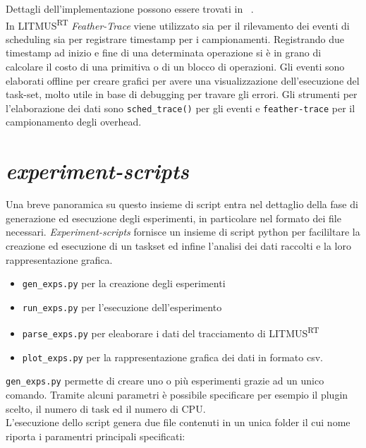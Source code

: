 \begin{appendices}
\noindent Dettagli dell'implementazione possono essere trovati in ~\cite{Brandenburg07feather-trace:a}.\\

\noindent In LITMUS\textsuperscript{RT} \textit{Feather-Trace} viene utilizzato sia per il rilevamento dei eventi di scheduling sia per registrare timestamp per i campionamenti. Registrando due timestamp ad inizio e fine di una determinata operazione si è in grano di calcolare il costo di una primitiva o di un blocco di operazioni. Gli eventi sono elaborati offline per creare grafici per avere una visualizzazione dell'esecuzione del task-set, molto utile in base di debugging per travare gli errori. Gli strumenti per l'elaborazione dei dati sono \texttt{sched\_trace()} per gli eventi e \texttt{feather-trace} per il campionamento degli overhead.\\

\section{\textit{experiment-scripts}}
\label{sec:exp-script}

\noindent Una breve panoramica su questo insieme di script entra nel dettaglio della fase di generazione ed esecuzione degli esperimenti, in particolare nel formato dei file necessari. \textit{Experiment-scripts} fornisce un insieme di script python per facililtare la creazione ed esecuzione di un taskset ed infine l'analisi dei dati raccolti e la loro rappresentazione grafica.\\

\begin{itemize}
	\item \texttt{gen\_exps.py} per la creazione degli esperimenti
	\item \texttt{run\_exps.py} per l'esecuzione dell'esperimento
	\item \texttt{parse\_exps.py} per eleaborare i dati del tracciamento di LITMUS\textsuperscript{RT}
	\item \texttt{plot\_exps.py} per la rappresentazione grafica dei dati in formato csv.
\end{itemize}

\noindent \texttt{gen\_exps.py} permette di creare uno o più esperimenti grazie ad un unico comando. Tramite alcuni parametri è possibile specificare per esempio il plugin scelto, il numero di task ed il numero di CPU.\\

\noindent L'esecuzione dello script genera due file contenuti in un unica folder il cui nome riporta i paramentri principali specificati:


\end{appendices}
